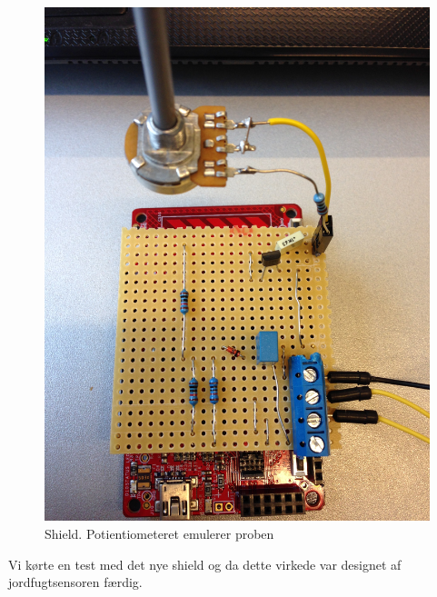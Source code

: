 \begin{figure}[H]
	\centering 
\includegraphics[scale=0.08]{HardwareArkitektur/Sensore/Jordfugt_billeder/shield.JPG}
	\caption{Shield. Potientiometeret emulerer proben}
	\label{photo:shield}
\end{figure} 

Vi kørte en test med det nye shield og da dette virkede var designet af jordfugtsensoren færdig. 

